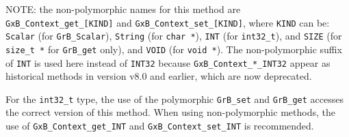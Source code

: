 NOTE: the non-polymorphic names for this method are
\verb'GxB_Context_get_[KIND]' and \verb'GxB_Context_set_[KIND]', where
\verb'KIND' can be:
    \verb'Scalar' (for \verb'GrB_Scalar'),
    \verb'String' (for \verb'char *'),
    \verb'INT' (for \verb'int32_t'), and
    \verb'SIZE' (for \verb'size_t *' for \verb'GrB_get' only), and
    \verb'VOID' (for \verb'void *').
The non-polymorphic suffix of \verb'INT' is used here instead of
\verb'INT32' because \verb'GxB_Context_*_INT32' appear as historical methods
in version v8.0 and earlier, which are now deprecated.

For the \verb'int32_t' type, the use of the polymorphic \verb'GrB_set' and
\verb'GrB_get' accesses the correct version of this method.  When using
non-polymorphic methods, the use of \verb'GxB_Context_get_INT' and
\verb'GxB_Context_set_INT' is recommended.

